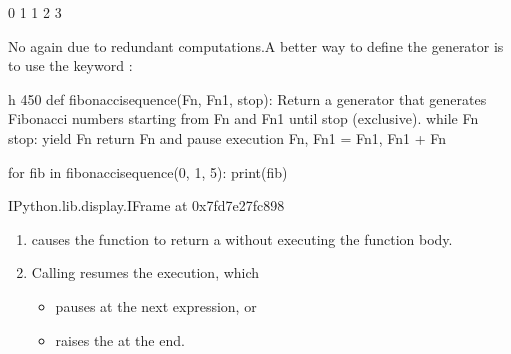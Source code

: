 \documentclass[letterpaper,10pt,english]{sphinxmanual}
\begin{document}
\begin{sphinxVerbatim}[commandchars=\\\{\}]
0
1
1
2
3
\end{sphinxVerbatim}


No again due to redundant computations.A better way to define the generator is to use the keyword :

\begin{sphinxVerbatim}[commandchars=\\\{\}]
 \PYGZhy{}h 450
def fibonacci\PYGZus{}sequence(Fn, Fn1, stop):
    \PYGZsq{}\PYGZsq{}\PYGZsq{}Return a generator that generates Fibonacci numbers
    starting from Fn and Fn1 until stop (exclusive).\PYGZsq{}\PYGZsq{}\PYGZsq{}
    while Fn \PYGZlt{} stop:
        yield Fn  \PYGZsh{} return Fn and pause execution
        Fn, Fn1 = Fn1, Fn1 + Fn


for fib in fibonacci\PYGZus{}sequence(0, 1, 5):
    print(fib)
\end{sphinxVerbatim}

\begin{sphinxVerbatim}[commandchars=\\\{\}]
\PYGZlt{}IPython.lib.display.IFrame at 0x7fd7e27fc898\PYGZgt{}
\end{sphinxVerbatim}
\begin{enumerate}
%
\item {} 
 causes the function to return a  without executing the function body.

\item {} 
Calling  resumes the execution, which
\begin{itemize}
\item {} 
pauses at the next  expression, or

\item {} 
raises the  at the end.

\end{itemize}

\end{enumerate}
\end{document}
